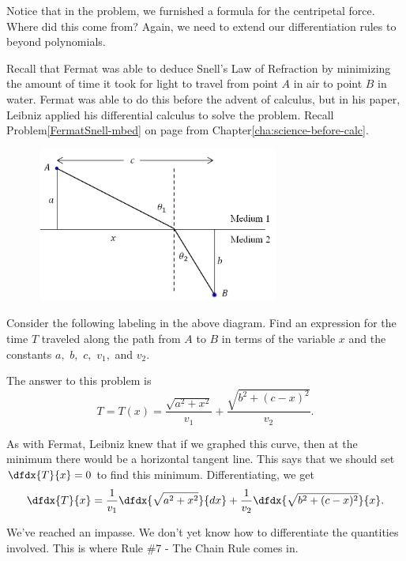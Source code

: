Notice that in the problem, we furnished a formula for the centripetal
force.  Where did this come from?  Again, we need to extend our
differentiation rules to beyond polynomials.

Recall that Fermat was able to deduce Snell's Law of Refraction by
minimizing the amount of time it took for light to travel from point $A$
in air to point $B$ in water\pageref{FermatSnell}.  Fermat was able to do this before
the advent of calculus, but in his paper, Leibniz applied his
differential calculus to solve the problem.  Recall
Problem\ref{FermatSnell-mbed} on page\pageref{FermatSnell} from
Chapter\ref{cha:science-before-calc}.
\begin{embeddedproblem}{}
\centerline{\includegraphics*[height=2in,width=4in]{Figures/Refraction3}}
Consider the following labeling in the above diagram.
 Find an expression for the time $T$ traveled along the path from $A$
 to $B$ in terms of the variable $x$ and the constants $a,$ $b,$ $c,$ $v_1,$
 and $v_2.$

 The answer to this problem is
 $$
 T=T(x)=\frac{\sqrt{a^2+x^2}}{v_1} +\frac{\sqrt{b^2+(c-x)^2}}{v_2}. 
 $$

As with Fermat, Leibniz knew that if we graphed this curve, then at
the minimum there would be a horizontal tangent line.  This says that
we should set $\dfdx{T}{x}=0$ to find this minimum.  Differentiating, we get
$$
\dfdx{T}{x}=\frac{1}{v_1}   \dfdx{\sqrt{a^2+x^2}}{dx}+\frac{1}{v_2}
\dfdx{\sqrt{b^2+(c-x)^2}}{x}.
$$

We've reached an impasse.  We don't yet know how to differentiate the
quantities involved.  This is where Rule \#7 - The Chain Rule comes in.




\end{embeddedproblem}

